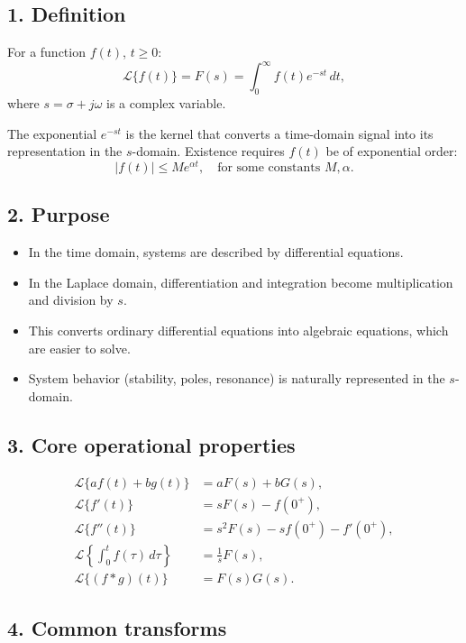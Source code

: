 \documentclass[12pt,a4paper]{article}
\begin{document}
	\subsection*{1. Definition}
	For a function $f(t)$, $t \geq 0$:
	$$
	\mathcal{L}\{f(t)\} = F(s) = \int_0^{\infty} f(t) e^{-st}\, dt,
	$$
	where $s = \sigma + j\omega$ is a complex variable.
	
	The exponential $e^{-st}$ is the kernel that converts a time-domain signal into its representation in the $s$-domain.  
	Existence requires $f(t)$ be of exponential order: 
	$$
	|f(t)| \leq M e^{\alpha t}, \quad \text{for some constants } M,\alpha.
	$$
	
	\subsection*{2. Purpose}
	\begin{itemize}
		\item In the time domain, systems are described by differential equations.
		\item In the Laplace domain, differentiation and integration become multiplication and division by $s$.
		\item This converts ordinary differential equations into algebraic equations, which are easier to solve.
		\item System behavior (stability, poles, resonance) is naturally represented in the $s$-domain.
	\end{itemize}
	
	\subsection*{3. Core operational properties}
	\begin{align*}
		\mathcal{L}\{af(t) + bg(t)\} &= aF(s) + bG(s), \\
		\mathcal{L}\{f'(t)\} &= sF(s) - f(0^+), \\
		\mathcal{L}\{f''(t)\} &= s^2 F(s) - sf(0^+) - f'(0^+), \\
		\mathcal{L}\left\{\int_0^t f(\tau)\, d\tau\right\} &= \frac{1}{s}F(s), \\
		\mathcal{L}\{(f*g)(t)\} &= F(s)G(s).
	\end{align*}
	
	\subsection*{4. Common transforms}
	
\end{document}
